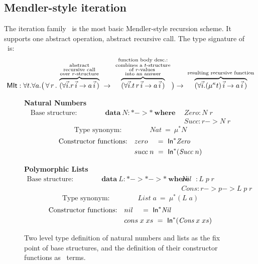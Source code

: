 \subsection{Mendler-style iteration}\label{sec:mendler:it}
The iteration family \MIt\ is the most basic Mendler-style recursion scheme.
It supports one abstract operation, abstract recursive call.
The type signature of \MIt\ is:
\[ \textsf{MIt} : \forall t . \forall a .
   \big(\, \forall\, r\, . \;
         \overset{\begin{smallmatrix}
                        \text{abstract} \\
                        \text{recursive call} \\
                        \text{over $r$-structure}
                       \end{smallmatrix}}{\overbrace{
            (\forall\vec{i} . r\,\vec{i} -> a\,\vec{i}\,) }} \;
   -> \; \overset{\begin{smallmatrix}
                        \text{function body desc.:} \\
                        \text{combines a $t$-structure} \\
                        \text{of $r$-values } \\
                        \text{into an answer}
                       \end{smallmatrix}}{\overbrace{
            (\forall\vec{i} . t\, r\,\vec{i} -> a\,\vec{i}\,) }}
   \big)
 -> \; \overset{\text{resulting recursive function}}{\overbrace{
          (\forall\vec{i} . (\mu^\kappa t)\,\vec{i} -> a\,\vec{i}\,) }} 
\]
\begin{figure}
{\bf Natural Numbers}
\begin{align*}
\text{Base structure:}\qquad\qquad
\textbf{data}~N : * -> * ~\textbf{where}~~
& \textit{Zero} : N\;r\\
& \textit{Succ} : r -> N\;r
\end{align*}
\[\text{Type synonym:}\qquad\qquad \textit{Nat} ~=~ \mu^{*} N\]
\begin{align*}
\text{Constructor functions:}\quad
&zero~~\,~=~ \textsf{In}^{*} \textit{Zero} \\
&succ\;n ~=~ \textsf{In}^{*} (\textit{Succ}\;n)
\end{align*}

{\bf Polymorphic Lists}
\begin{align*}
\text{Base structure:}\qquad\qquad
\textbf{data}~L : * -> * -> * ~\textbf{where}~~
& \textit{Nil}~~\, : L\;p\;r \\
& \textit{Cons}    : r -> p -> L\;p\;r
\end{align*}
\[\text{Type synonym:}\qquad\qquad \textit{List} \; a  ~=~ \mu^{*} (L\;a)\]
\begin{align*}
\text{Constructor functions:}\quad
&nil~~\,~=~ \textsf{In}^{*} \textit{Nil} \\
&cons\;x\;xs ~=~ \textsf{In}^{*} (\textit{Cons}\;x\;xs)
\end{align*}


\caption{Two level type definition of natural numbers and lists as the fix point of base structures, and
         the definition of their constructor functions as \In\ terms.}
\label{fig:natdef}
\end{figure}
